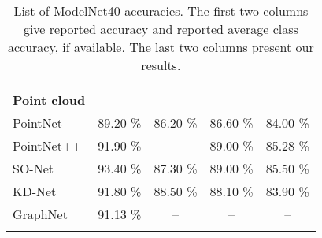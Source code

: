 \begin{table}[]
\begin{tabular}{lcccc}
		                     &                    &                     &                   &                     \\
		\textbf{Point cloud} &                    &                     &                   &                     \\
		PointNet             &      89.20 \%      &      86.20 \%       &     86.60 \%      &      84.00 \%       \\
		PointNet++           &      91.90 \%      &         --          &     89.00 \%      &      85.28 \%       \\
		SO-Net               &      93.40 \%      &      87.30 \%       &     89.00 \%      &      85.50 \%       \\
		KD-Net               &      91.80 \%      &      88.50 \%       &     88.10 \%      &      83.90 \%       \\
		GraphNet             &      91.13 \%      &         --          &        --         &         --          \\ \hline
		                     &                    &                     &                   &
	\end{tabular}
\caption{List of ModelNet40 accuracies. The first two columns give reported accuracy and reported average class accuracy, if available. The last two columns present our results.}
\label{Table:accs}
\end{table}